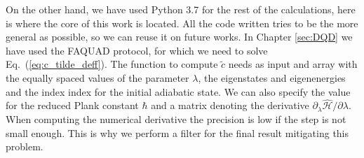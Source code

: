 On the other hand, we have used Python 3.7 for the rest of the calculations, here is where the core of this work is located. All the code written tries to be the more general as possible, so we can reuse it on future works. In Chapter \ref{sec:DQD} we have used the FAQUAD protocol, for which we need to solve Eq.~(\ref{eq:c_tilde_deff}). The function to compute $\tilde{c}$ needs as input and array with the equally spaced values of the parameter $\lambda$, the eigenstates and eigenenergies and the index index for the initial adiabatic state. We can also specify the value for the reduced Plank constant $\hbar$ and a matrix denoting the derivative $\partial_\lambda \hat{\mathcal{H}}/\partial\lambda$. When computing the numerical derivative the precision is low if the step is not small enough. This is why we perform a filter for the final result mitigating this problem.
